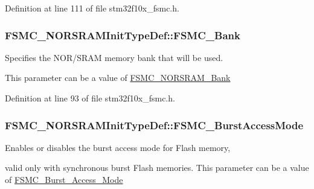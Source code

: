 Definition at line 111 of file stm32f10x\-\_\-fsmc.\-h.

\hypertarget{struct_f_s_m_c___n_o_r_s_r_a_m_init_type_def_a7fcd864461cf0d1cf83b62fa2b4d3f86}{
\subsubsection[{F\-S\-M\-C\-\_\-\-Bank}]{ F\-S\-M\-C\-\_\-\-N\-O\-R\-S\-R\-A\-M\-Init\-Type\-Def\-::\-F\-S\-M\-C\-\_\-\-Bank}}\label{struct_f_s_m_c___n_o_r_s_r_a_m_init_type_def_a7fcd864461cf0d1cf83b62fa2b4d3f86}
\begin{DoxyVerb}                Specifies the NOR/SRAM memory bank that will be used.
\end{DoxyVerb}
 This parameter can be a value of \hyperlink{group___f_s_m_c___n_o_r_s_r_a_m___bank}{F\-S\-M\-C\-\_\-\-N\-O\-R\-S\-R\-A\-M\-\_\-\-Bank} 

Definition at line 93 of file stm32f10x\-\_\-fsmc.\-h.

\hypertarget{struct_f_s_m_c___n_o_r_s_r_a_m_init_type_def_aec0bfff5c934c251c21450a50f5bdb79}{
\subsubsection[{F\-S\-M\-C\-\_\-\-Burst\-Access\-Mode}]{ F\-S\-M\-C\-\_\-\-N\-O\-R\-S\-R\-A\-M\-Init\-Type\-Def\-::\-F\-S\-M\-C\-\_\-\-Burst\-Access\-Mode}}\label{struct_f_s_m_c___n_o_r_s_r_a_m_init_type_def_aec0bfff5c934c251c21450a50f5bdb79}
\begin{DoxyVerb}     Enables or disables the burst access mode for Flash memory,
\end{DoxyVerb}
 valid only with synchronous burst Flash memories. This parameter can be a value of \hyperlink{group___f_s_m_c___burst___access___mode}{F\-S\-M\-C\-\_\-\-Burst\-\_\-\-Access\-\_\-\-Mode} 


